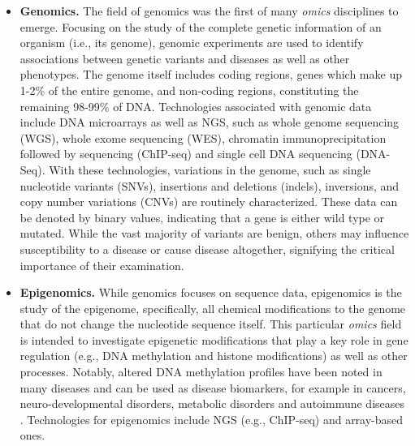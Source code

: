 \begin{itemize}
    \item   \textbf{Genomics.} The field of genomics was the first of many \textit{omics} disciplines to emerge. Focusing on the study of the complete genetic information of an organism (i.e., its genome), genomic experiments are used to identify associations between genetic variants and diseases as well as other phenotypes. The genome itself includes coding regions, genes which make up 1-2\% of the entire genome, and non-coding regions, constituting the remaining 98-99\% of DNA. Technologies associated with genomic data include DNA microarrays as well as NGS, such as whole genome sequencing (WGS), whole exome sequencing (WES), chromatin immunoprecipitation followed by sequencing (ChIP-seq) and single cell DNA sequencing (DNA-Seq). With these technologies, variations in the genome, such as single nucleotide variants (SNVs), insertions and deletions (indels), inversions, and copy number variations (CNVs) are routinely characterized. These data can be denoted by binary values, indicating that a gene is either wild type or mutated. While the vast majority of variants are benign, others may influence susceptibility to a disease or cause disease altogether, signifying the critical importance of their examination.
    
    \item   \textbf{Epigenomics.} While genomics focuses on sequence data, epigenomics is the study of the epigenome, specifically, all chemical modifications to the genome that do not change the nucleotide sequence itself. This particular \textit{omics} field is intended to investigate epigenetic modifications that play a key role in gene regulation (e.g., DNA methylation and histone modifications) as well as other processes. Notably, altered DNA methylation profiles have been noted in many diseases and can be used as disease biomarkers, for example in cancers, neuro-developmental disorders, metabolic disorders and autoimmune diseases \parencite{heyn2012}. Technologies for epigenomics include NGS (e.g., ChIP-seq) and array-based ones. 
    

\end{itemize}
